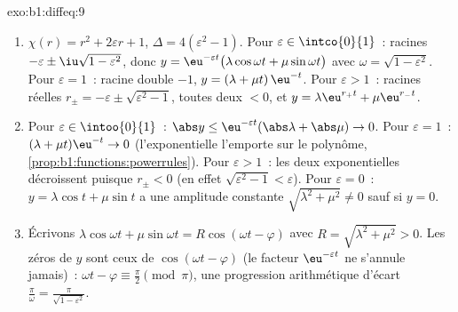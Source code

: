 \begin{solution}{exo:b1:diffeq:9}
\begin{enumerate}
  \item $\chi(r) = r^2 + 2\varepsilon r + 1$, $\Delta = 4(\varepsilon^2
        - 1)$.
        Pour $\varepsilon \in \intco{0}{1}$~: racines $-\varepsilon \pm
        \iu\sqrt{1 - \varepsilon^2}$, donc
        $y = \eu^{-\varepsilon t}\bigl(\lambda\cos\omega t +
        \mu\sin\omega t\bigr)$ avec $\omega = \sqrt{1 -
        \varepsilon^2}$.
        Pour $\varepsilon = 1$~: racine double $-1$, $y = (\lambda +
        \mu t)\,\eu^{-t}$.
        Pour $\varepsilon > 1$~: racines réelles $r_\pm = -\varepsilon
        \pm \sqrt{\varepsilon^2 - 1}$, toutes deux $< 0$, et $y =
        \lambda\eu^{r_+t} + \mu\eu^{r_-t}$.
  \item Pour $\varepsilon \in \intoo{0}{1}$~: $\abs y \leq
        \eu^{-\varepsilon t}(\abs\lambda + \abs\mu) \to 0$. Pour
        $\varepsilon = 1$~: $(\lambda + \mu t)\eu^{-t} \to 0$
        (l'exponentielle l'emporte sur le polynôme,
        \cref{prop:b1:functions:powerrules}). Pour $\varepsilon > 1$~:
        les deux exponentielles décroissent puisque $r_\pm < 0$ (en
        effet $\sqrt{\varepsilon^2 - 1} < \varepsilon$). Pour
        $\varepsilon = 0$~: $y = \lambda\cos t + \mu\sin t$ a une
        amplitude constante $\sqrt{\lambda^2 + \mu^2} \neq 0$ sauf si
        $y = 0$.
  \item Écrivons $\lambda\cos\omega t + \mu\sin\omega t =
        R\cos(\omega t - \varphi)$ avec $R = \sqrt{\lambda^2 + \mu^2}
        > 0$. Les zéros de $y$ sont ceux de $\cos(\omega t -
        \varphi)$ (le facteur $\eu^{-\varepsilon t}$ ne s'annule
        jamais)~: $\omega t - \varphi \equiv \frac\pi2 \pmod \pi$, une
        progression arithmétique d'écart $\frac{\pi}{\omega} =
        \frac{\pi}{\sqrt{1 - \varepsilon^2}}$.
\end{enumerate}
\end{solution}

